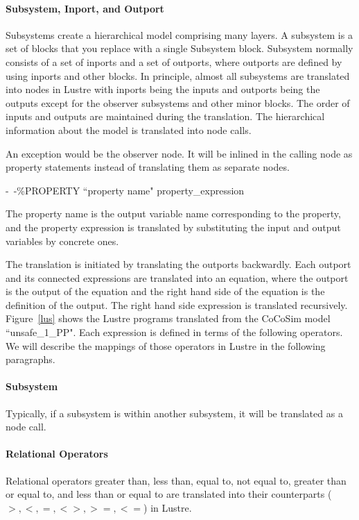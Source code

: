\documentclass{article}
\begin{document}
\paragraph{Subsystem, Inport, and Outport} 
Subsystems create a hierarchical model comprising many layers. 
A subsystem is a set of blocks that you replace with a single \textsf{Subsystem} block. 
Subsystem normally consists of a set of inports and a set of outports, where outports are
defined by using inports and other blocks. 
In principle, almost all subsystems are translated into nodes in Lustre with inports being the 
inputs and outports being the outputs except for the observer subsystems and other minor blocks. 
The order of inputs and outputs are maintained during the translation. 
The hierarchical information about the model is translated into node calls.

An exception would be the observer node.
It will be inlined in the calling node as property statements instead of translating them 
as separate nodes.

\*

\indent \indent \indent \indent \textsf{-\ -\%PROPERTY ``property name" property\_expression}

\*


\noindent The \textsf{property name} is the output variable name corresponding to the property, 
and the property expression is translated by substituting the input and output variables by concrete ones.

The translation is initiated by translating the outports backwardly. 
Each outport and its connected expressions are translated into an equation, where the outport is the output of the equation 
and the right hand side of the equation is the definition of the output.
The right hand side expression is translated recursively.
Figure~\ref{lus} shows the Lustre programs translated from the CoCoSim model ``unsafe\_1\_PP".
Each expression is defined in terms of the following operators. 
We will describe the mappings of those operators in Lustre in the following paragraphs.

\paragraph{Subsystem} 
Typically, if a subsystem is within another subsystem, it will be translated as a node call.


\paragraph{Relational Operators} 
Relational operators greater than, less than, equal to, not equal to, greater 
than or equal to, and less than or equal to are translated into their counterparts 
($>, <, =, <>, >=, <=$) in Lustre.
\end{document}

